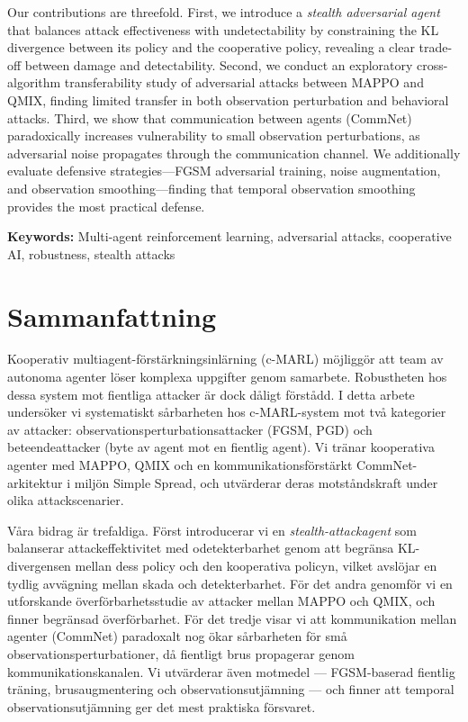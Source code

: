 \documentclass[12pt,a4paper]{article}
\begin{document}
Our contributions are threefold. First, we introduce a \emph{stealth adversarial agent} that balances attack effectiveness with undetectability by constraining the KL divergence between its policy and the cooperative policy, revealing a clear trade-off between damage and detectability. Second, we conduct an exploratory cross-algorithm transferability study of adversarial attacks between MAPPO and QMIX, finding limited transfer in both observation perturbation and behavioral attacks. Third, we show that communication between agents (CommNet) paradoxically increases vulnerability to small observation perturbations, as adversarial noise propagates through the communication channel. We additionally evaluate defensive strategies---FGSM adversarial training, noise augmentation, and observation smoothing---finding that temporal observation smoothing provides the most practical defense.

\textbf{Keywords:} Multi-agent reinforcement learning, adversarial attacks, cooperative AI, robustness, stealth attacks

\newpage
\section*{Sammanfattning}

Kooperativ multiagent-f{\"o}rst{\"a}rkningsinl{\"a}rning (c-MARL) m{\"o}jligg{\"o}r att team av autonoma agenter l{\"o}ser komplexa uppgifter genom samarbete. Robustheten hos dessa system mot fientliga attacker {\"a}r dock d{\aa}ligt f{\"o}rst{\aa}dd. I detta arbete unders{\"o}ker vi systematiskt s{\aa}rbarheten hos c-MARL-system mot tv{\aa} kategorier av attacker: observationsperturbationsattacker (FGSM, PGD) och beteendeattacker (byte av agent mot en fientlig agent). Vi tr{\"a}nar kooperativa agenter med MAPPO, QMIX och en kommunikationsf{\"o}rst{\"a}rkt CommNet-arkitektur i milj{\"o}n Simple Spread, och utv{\"a}rderar deras motst{\aa}ndskraft under olika attackscenarier.

V{\aa}ra bidrag {\"a}r trefaldiga. F{\"o}rst introducerar vi en \emph{stealth-attackagent} som balanserar attackeffektivitet med odetekterbarhet genom att begr{\"a}nsa KL-divergensen mellan dess policy och den kooperativa policyn, vilket avsl{\"o}jar en tydlig avv{\"a}gning mellan skada och detekterbarhet. F{\"o}r det andra genomf{\"o}r vi en utforskande {\"o}verf{\"o}rbarhetsstudie av attacker mellan MAPPO och QMIX, och finner begr{\"a}nsad {\"o}verf{\"o}rbarhet. F{\"o}r det tredje visar vi att kommunikation mellan agenter (CommNet) paradoxalt nog {\"o}kar s{\aa}rbarheten f{\"o}r sm{\aa} observationsperturbationer, d{\aa} fientligt brus propagerar genom kommunikationskanalen. Vi utv{\"a}rderar {\"a}ven motmedel --- FGSM-baserad fientlig tr{\"a}ning, brusaugmentering och observationsutj{\"a}mning --- och finner att temporal observationsutj{\"a}mning ger det mest praktiska f{\"o}rsvaret.
\end{document}

